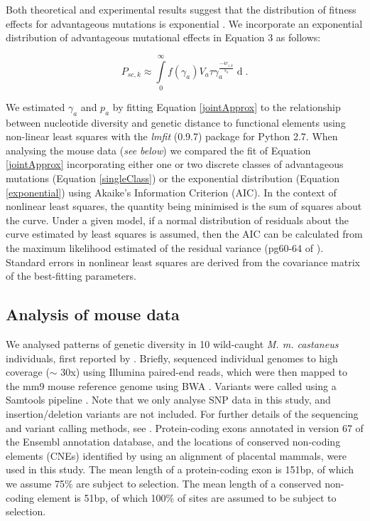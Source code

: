 	Both theoretical and experimental results suggest that the distribution of fitness effects for advantageous mutations is exponential \citep{RN109}. We incorporate an exponential distribution of advantageous mutational effects in Equation 3 as follows:

		\begin{equation}
		\label{exponential}
P_{sc,k} \approx \int \limits_{0}^{\infty} f(\gamma_a) V_a \tau\gamma_a^{\frac{-4r_{i,k}}{s_a}} \mathop{d\gamma_a}.
		\end{equation}

	We estimated $\gamma_a$ and $p_a$ by fitting Equation \ref{jointApprox} to the relationship between nucleotide diversity and genetic distance to functional elements using non-linear least squares with the \emph{lmfit} (0.9.7) package for Python 2.7. When analysing the mouse data (\textit{see below}) we compared the fit of Equation \ref{jointApprox} incorporating either one or two discrete classes of advantageous mutations (Equation \ref{singleClass}) or the exponential distribution (Equation \ref{exponential}) using Akaike's Information Criterion (AIC). In the context of nonlinear least squares, the quantity being minimised is the sum of squares about the curve. Under a given model, if a normal distribution of residuals about the curve estimated by least squares is assumed, then the AIC can be calculated from the maximum likelihood estimated of the residual variance (pg60-64 of \citealt{RN393}). Standard errors in nonlinear least squares are derived from the covariance matrix of the best-fitting parameters.
		
	\subsection{Analysis of mouse data}

	We analysed patterns of genetic diversity in 10 wild-caught \textit{M. m. castaneus} individuals, first reported by \cite{RN122}. Briefly, \cite{RN122} sequenced individual genomes to high coverage ($\sim$ 30x) using Illumina paired-end reads, which were then mapped to the mm9 mouse reference genome using BWA \citep{RN251}. Variants were called using a Samtools pipeline \citep{RN252}. Note that we only analyse SNP data in this study, and insertion/deletion variants are not included. For further details of the sequencing and variant calling methods, see \cite{RN122}. Protein-coding exons annotated in version 67 of the Ensembl annotation database, and the locations of conserved non-coding elements (CNEs) identified by \cite{RN122} using an alignment of placental mammals, were used in this study. The mean length of a protein-coding exon is 151bp, of which we assume 75\% are subject to selection. The mean length of a conserved non-coding element is 51bp, of which 100\% of sites are assumed to be subject to selection.

